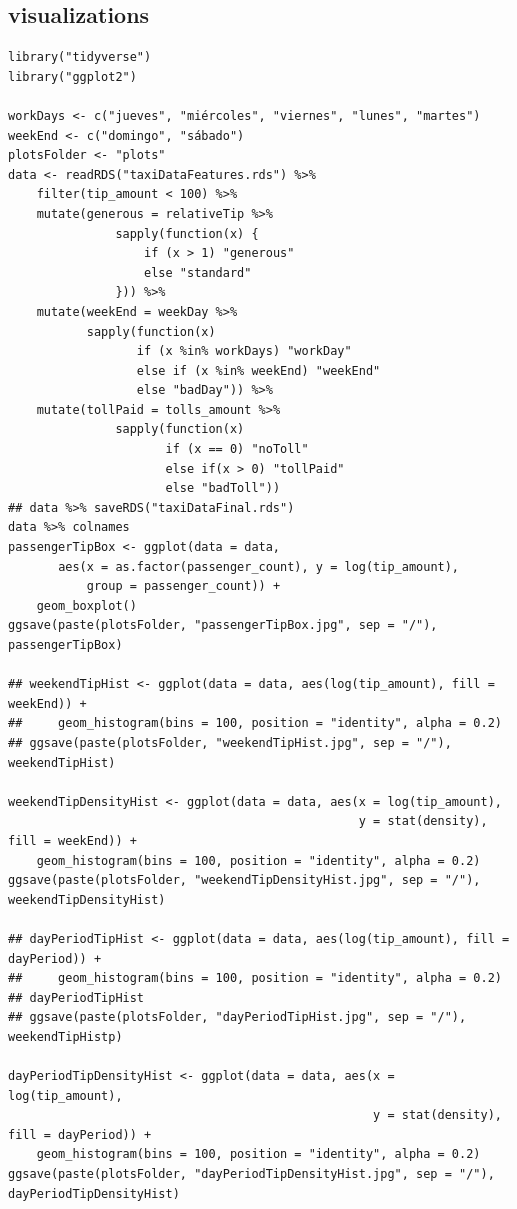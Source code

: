 \documentclass[11pt]{article}
\begin{document}
\subsection{visualizations}
\label{sec:orgd070d8c}
\begin{verbatim}
library("tidyverse")
library("ggplot2")

workDays <- c("jueves", "miércoles", "viernes", "lunes", "martes")
weekEnd <- c("domingo", "sábado")
plotsFolder <- "plots"
data <- readRDS("taxiDataFeatures.rds") %>%
    filter(tip_amount < 100) %>% 
    mutate(generous = relativeTip %>%
               sapply(function(x) {
                   if (x > 1) "generous"
                   else "standard"
               })) %>%
    mutate(weekEnd = weekDay %>%
           sapply(function(x)
                  if (x %in% workDays) "workDay"
                  else if (x %in% weekEnd) "weekEnd"
                  else "badDay")) %>%
    mutate(tollPaid = tolls_amount %>%
               sapply(function(x)
                      if (x == 0) "noToll"
                      else if(x > 0) "tollPaid"
                      else "badToll"))
## data %>% saveRDS("taxiDataFinal.rds")
data %>% colnames
passengerTipBox <- ggplot(data = data,
       aes(x = as.factor(passenger_count), y = log(tip_amount),
           group = passenger_count)) +
    geom_boxplot()
ggsave(paste(plotsFolder, "passengerTipBox.jpg", sep = "/"),  passengerTipBox)

## weekendTipHist <- ggplot(data = data, aes(log(tip_amount), fill = weekEnd)) +
##     geom_histogram(bins = 100, position = "identity", alpha = 0.2)
## ggsave(paste(plotsFolder, "weekendTipHist.jpg", sep = "/"),  weekendTipHist)

weekendTipDensityHist <- ggplot(data = data, aes(x = log(tip_amount),
                                                 y = stat(density), fill = weekEnd)) +
    geom_histogram(bins = 100, position = "identity", alpha = 0.2)
ggsave(paste(plotsFolder, "weekendTipDensityHist.jpg", sep = "/"),  weekendTipDensityHist)

## dayPeriodTipHist <- ggplot(data = data, aes(log(tip_amount), fill = dayPeriod)) +
##     geom_histogram(bins = 100, position = "identity", alpha = 0.2)
## dayPeriodTipHist
## ggsave(paste(plotsFolder, "dayPeriodTipHist.jpg", sep = "/"),  weekendTipHistp)

dayPeriodTipDensityHist <- ggplot(data = data, aes(x = log(tip_amount),
                                                   y = stat(density), fill = dayPeriod)) +
    geom_histogram(bins = 100, position = "identity", alpha = 0.2)
ggsave(paste(plotsFolder, "dayPeriodTipDensityHist.jpg", sep = "/"),  dayPeriodTipDensityHist)


\end{verbatim}
\end{document}
